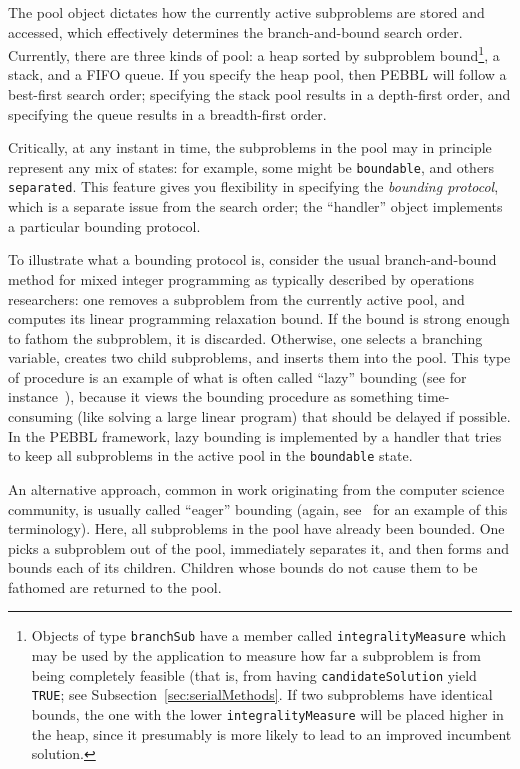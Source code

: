 The pool object dictates how the currently active subproblems are
stored and accessed, which effectively determines the branch-and-bound
search order.  Currently, there are three kinds of pool: a heap sorted
by subproblem bound\footnote{Objects of type \texttt{branchSub} have a
member called \texttt{integralityMeasure} which may be used by the
application to measure how far a subproblem is from being completely
feasible (that is, from having \texttt{candidateSolution} yield
\texttt{TRUE}; see Subsection~\ref{sec:serialMethods}.  If two
subproblems have identical bounds, the one with the lower
\texttt{integralityMeasure} will be placed higher in the heap, since
it presumably is more likely to lead to an improved incumbent
solution.}, a stack, and a FIFO queue.  If you specify the heap
pool, then PEBBL will follow a best-first search order; specifying the
stack pool results in a depth-first order, and specifying the queue
results in a breadth-first order. 

Critically, at any instant in time, the subproblems in the pool may in
principle represent any mix of states: for example, some might be
\texttt{boundable}, and others \texttt{separated}.  This feature gives
you flexibility in specifying the \emph{bounding protocol}, which
is a separate issue from the search order; the ``handler'' object
implements a particular bounding protocol.

To illustrate what a bounding protocol is, consider the usual
branch-and-bound method for mixed integer programming as typically
described by operations researchers: one removes a subproblem from the
currently active pool, and computes its linear programming relaxation
bound.  If the bound is strong enough to fathom the subproblem, it is
discarded.  Otherwise, one selects a branching variable, creates two
child subproblems, and inserts them into the pool.  This type of
procedure is an example of what is often called ``lazy'' bounding (see
for instance~\cite{CP99}), because it views the bounding procedure as
something time-consuming (like solving a large linear program) that
should be delayed if possible.  In the PEBBL framework, lazy bounding
is implemented by a handler that tries to keep all subproblems in the
active pool in the \texttt{boundable} state.

An alternative approach, common in work originating from the computer
science community, is usually called ``eager'' bounding (again,
see~\cite{CP99} for an example of this terminology).  Here, all
subproblems in the pool have already been bounded.  One picks a
subproblem out of the pool, immediately separates it,
and then forms and bounds each of its children.  Children whose bounds do
not cause them to be fathomed are returned to the pool.  


